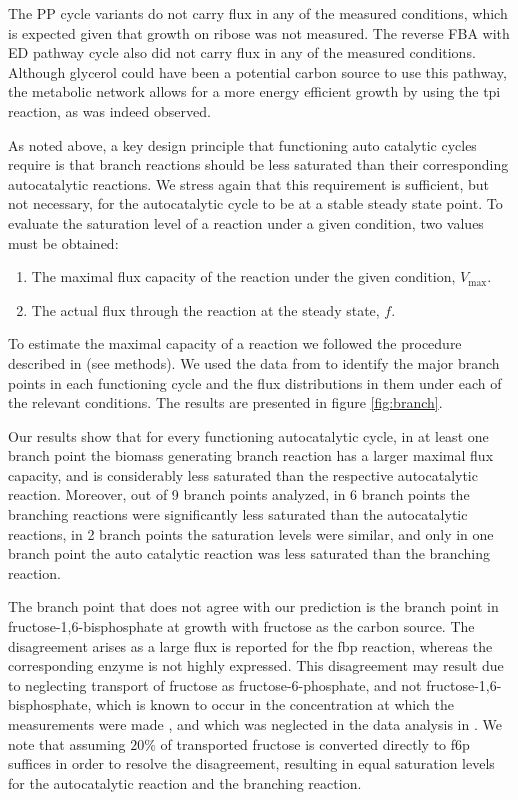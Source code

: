     The PP cycle variants do not carry flux in any of the measured conditions, which is expected given that growth on ribose was not measured.
    The reverse FBA with ED pathway cycle also did not carry flux in any of the measured conditions.
    Although glycerol could have been a potential carbon source to use this pathway, the metabolic network allows for a more energy efficient growth by using the tpi reaction, as was indeed observed.

    As noted above, a key design principle that functioning auto catalytic cycles require is that branch reactions should be less saturated than their corresponding autocatalytic reactions.
    We stress again that this requirement is sufficient, but not necessary, for the autocatalytic cycle to be at a stable steady state point.
    To evaluate the saturation level of a reaction under a given condition, two values must be obtained:
    \begin{enumerate}
      \item The maximal flux capacity of the reaction under the given condition, $V_{\max}$.
        \item The actual flux through the reaction at the steady state, $f$.
    \end{enumerate}

    To estimate the maximal capacity of a reaction we followed the procedure described in \cite{Davidi2016-ga} (see methods).
    We used the data from \cite{Gerosa2015-oq} to identify the major branch points in each functioning cycle and the flux distributions in them under each of the relevant conditions.
    The results are presented in figure \ref{fig:branch}.

    Our results show that for every functioning autocatalytic cycle, in at least one branch point the biomass generating branch reaction has a larger maximal flux capacity, and is considerably less saturated than the respective autocatalytic reaction.
    Moreover, out of 9 branch points analyzed, in 6 branch points the branching reactions were significantly less saturated than the autocatalytic reactions, in 2 branch points the saturation levels were similar, and only in one branch point the auto catalytic reaction was less saturated than the branching reaction.

    The branch point that does not agree with our prediction is the branch point in fructose-1,6-bisphosphate at growth with fructose as the carbon source.
    The disagreement arises as a large flux is reported for the fbp reaction, whereas the corresponding enzyme is not highly expressed.
    This disagreement may result due to neglecting transport of fructose as fructose-6-phosphate, and not fructose-1,6-bisphosphate, which is known to occur in the concentration at which the measurements were made \cite{Kornberg1990-ft}, and which was neglected in the data analysis in \cite{Gerosa2015-oq}.
    We note that assuming $20\%$ of transported fructose is converted directly to f6p suffices in order to resolve the disagreement, resulting in equal saturation levels for the autocatalytic reaction and the branching reaction.

